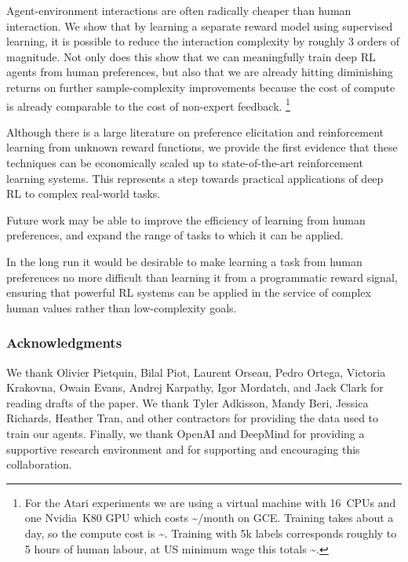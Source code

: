 \documentclass{article}
\begin{document}
Agent-environment interactions are often radically cheaper than human interaction.
We show that by learning a separate reward model using supervised learning,
it is possible to reduce the interaction complexity by roughly 3 orders of magnitude.
Not only does this show that we can meaningfully train deep RL agents from human preferences,
but also that we are already hitting diminishing returns on further sample-complexity improvements
because the cost of compute is already comparable to the cost of non-expert feedback.%
\footnote{For the Atari experiments we are using a virtual machine with 16~CPUs and one Nvidia~K80 GPU which costs \textasciitilde{}/month on GCE.
Training takes about a day, so the compute cost is \textasciitilde{}.
Training with 5k labels corresponds roughly to 5 hours of human labour,
at US minimum wage this totals \textasciitilde{}.}

Although there is a large literature on preference elicitation and reinforcement learning from unknown reward functions,
we provide the first evidence that these techniques can be economically scaled up to state-of-the-art reinforcement learning systems.
This represents a step towards practical applications of deep RL to complex real-world tasks.

Future work may be able to improve the efficiency of learning from human preferences,
and expand the range of tasks to which it can be applied.

In the long run it would be desirable to make learning a task from human preferences
no more difficult than learning it from a programmatic reward signal,
ensuring that powerful RL systems can be applied in the service of complex human values
rather than low-complexity goals.


\subsubsection*{Acknowledgments}
We thank Olivier Pietquin, Bilal Piot, Laurent Orseau, Pedro Ortega, Victoria Krakovna, Owain Evans, Andrej Karpathy, Igor Mordatch, and Jack Clark for reading drafts of the paper. We thank Tyler Adkisson, Mandy Beri, Jessica Richards, Heather Tran, and other contractors for providing the data used to train our agents.
Finally, we thank OpenAI and DeepMind for providing a supportive research environment and for 
supporting and encouraging this collaboration.
\end{document}
